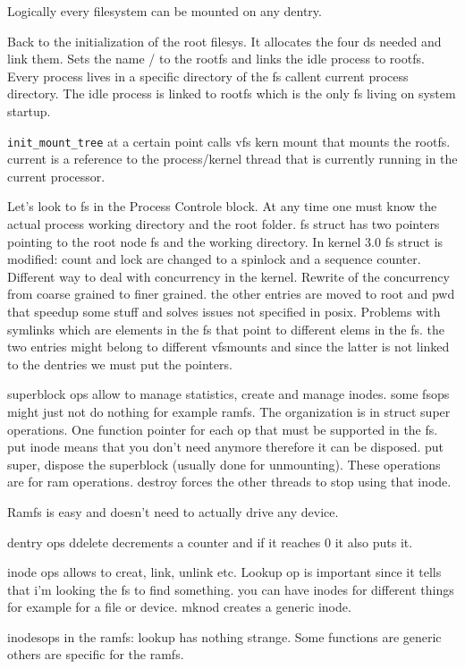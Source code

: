 \documentclass[twoside]{article}
\begin{document}
Logically every filesystem can be mounted on any dentry.

Back to the initialization of the root filesys. It allocates the four ds needed
and link them. Sets the name / to the rootfs and links the idle process to
rootfs. Every process lives in a specific directory of the fs callent current
process directory. The idle process is linked to rootfs which is the only fs
living on system startup. 

\texttt{init_mount_tree} at a certain point calls vfs kern mount that mounts the
rootfs. current is a reference to the process/kernel thread that is currently
running in the current processor.

Let's look to fs in the Process Controle block. At any time one must know the
actual process working directory and the root folder. fs struct has two pointers
pointing to the root node fs and the working directory. In kernel 3.0 fs struct
is modified: count and lock are changed to a spinlock and a sequence counter.
Different way to deal with concurrency in the kernel. Rewrite of the concurrency
from coarse grained to finer grained. the other entries are moved to root and
pwd that speedup some stuff and solves issues not specified in posix. Problems
with symlinks which are elements in the fs that point to different elems in the
fs. the two entries might belong to different vfsmounts and since the latter is
not linked to the dentries we must put the pointers.

superblock ops allow to manage statistics, create and manage inodes. some fsops
might just not do nothing for example ramfs. The organization is in struct super
operations. One function pointer for each op that must be supported in the fs.
put inode means that you don't need anymore therefore it can be disposed. put
super, dispose the superblock (usually done for unmounting). These operations
are for ram operations. destroy forces the other threads to stop using that
inode.

Ramfs is easy and doesn't need to actually drive any device. 

dentry ops ddelete decrements a counter and if it reaches 0 it also puts it.

inode ops allows to creat, link, unlink etc. Lookup op is important since it
tells that i'm looking the fs to find something. you can have inodes for
different things for example for a file or device. mknod creates a generic
inode.

inodesops in the ramfs: lookup has nothing strange. Some functions are generic
others are specific for the ramfs.
\end{document}
